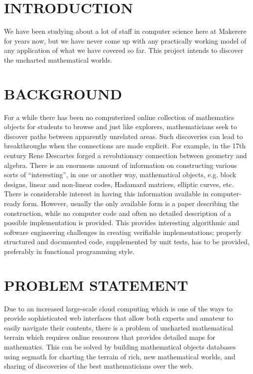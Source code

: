 \documentclass{article}
\begin{document}
\section{INTRODUCTION}\label{sec:intro}
We have been studying about a lot of staff in computer science here at Makerere for years now, but we have never come up with any practically working model of any application of what we have covered so far. This project intends to discover the uncharted mathematical worlds. \\

\section{BACKGROUND}
For a while there has been no computerized online collection of mathematics objects for students to browse and just like explorers, mathematicians seek to discover paths between apparently unrelated areas. Such discoveries can lead to breakthroughs when the connections are made explicit. For example, in the 17th century Rene Descartes forged a revolutionary connection between geometry and algebra. 
There is an enormous amount of information on constructing various sorts of “interesting”, in one or another way, mathematical objects, e.g. block designs, linear and non-linear codes, Hadamard matrices, elliptic curves, etc.  There is considerable interest in having this information available in computer-ready form.  However, usually the only available form is a paper describing the construction, while no computer code and often no detailed description of a possible implementation is provided. This provides interesting algorithmic and software engineering challenges in creating verifiable implementations; properly structured and documented code, supplemented by unit tests, has to be provided, preferably in functional programming style. \\

\section{PROBLEM STATEMENT}
Due to an increased large-scale cloud computing which is one of the ways to provide sophisticated web interfaces that allow both experts and amateur to easily navigate their contents, there is a problem of uncharted mathematical terrain which requires online resources that provides detailed maps for mathematics. This can be solved by building mathematical objects databases using segmath for charting the terrain of rich, new mathematical worlds, and sharing of discoveries of the best mathematicians over the web.   \\
\end{document}
